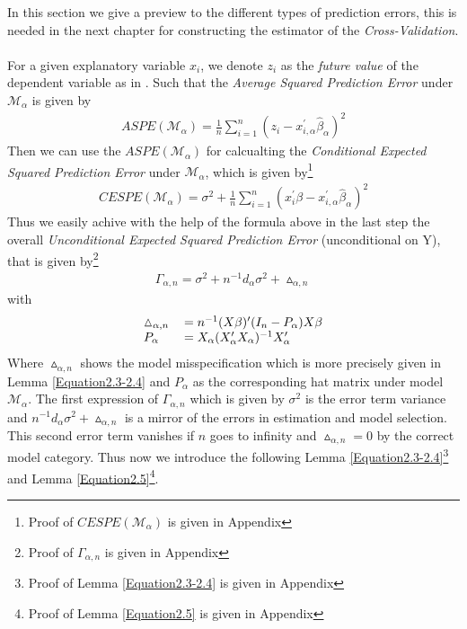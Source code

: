 \documentclass[Research_Module_ES.tex]{subfiles}
\begin{document}
In this section we give a preview to the different types of prediction errors, this is needed in the next chapter for constructing the estimator of the \textit{Cross-Validation}.\\\\
For a given explanatory variable $x_i$, we denote $z_i$ as the \textit{future value} of the dependent variable as in \cite{shao}. Such that the \textit{Average Squared Prediction Error} under $\mathcal{M}_\alpha$ is given by
\begin{align}
ASPE(\mathcal{M}_\alpha)=\frac{1}{n}\sum_{i=1}^{n}(z_i-x_{i,\alpha}^\prime\hat{\beta}_\alpha)^2 \label{ASPE}
\end{align}
Then we can use the $ASPE(\mathcal{M}_\alpha)$ for calcualting the \textit{Conditional Expected Squared Prediction Error} under $\mathcal{M}_\alpha$, which is given by\footnote{Proof of $CESPE(\mathcal{M}_\alpha)$ is given in Appendix }
\begin{align*}
CESPE(\mathcal{M}_\alpha)=\sigma^2+\frac{1}{n}\sum_{i=1}^{n}(x_i^\prime\beta-x_{i,\alpha}^\prime\hat{\beta}_\alpha)^2
\end{align*}
Thus we easily achive with the help of the formula above in the last step the overall \textit{Unconditional Expected Squared Prediction Error} (unconditional on Y), that is given by\footnote{Proof of $\Gamma_{\alpha,n}$ is given in Appendix } 
\begin{align}
\Gamma_{\alpha,n}=\sigma^2+n^{-1}d_\alpha\sigma^2+\vartriangle_{\alpha,n} 
\end{align}
with
\begin{align*}
\begin{tabular}{ll}
$\vartriangle_{\alpha,n}$&$=n^{-1}(X\beta)^\prime(I_n-P_\alpha)X\beta$\\
$P_\alpha$&$=X_\alpha(X_\alpha^\prime X_\alpha)^{-1}X_\alpha^\prime$
\end{tabular}
\end{align*} 
Where $\vartriangle_{\alpha,n}$ shows the model misspecification which is more precisely given in Lemma \ref{Equation2.3-2.4} and $P_\alpha$ as the corresponding hat matrix under model $\mathcal{M}_\alpha.$ The first expression of $\Gamma_{\alpha,n}$ which is given by $\sigma^2$ is the error term variance and $n^{-1}d_\alpha\sigma^2+\vartriangle_{\alpha,n}$ is a mirror of the errors in estimation and model selection. This second error term vanishes if $n$ goes to infinity and $\vartriangle_{\alpha,n}=0$ by the correct model category. Thus now we introduce the following Lemma \ref{Equation2.3-2.4}\footnote{Proof of Lemma \ref{Equation2.3-2.4} is given in Appendix }
and Lemma \ref{Equation2.5}\footnote{Proof of Lemma \ref{Equation2.5} is given in Appendix }.
\end{document}
